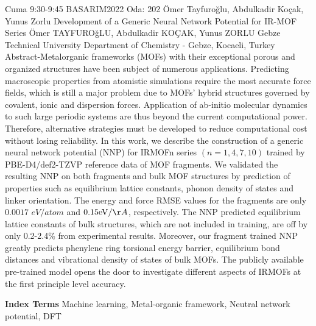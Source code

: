 
    \begin{abstract_basarim}
    {Cuma 9:30-9:45}
    {BASARIM2022}
    {Oda: 202}
    {Ömer Tayfuroğlu, Abdulkadir Koçak, Yunus Zorlu}
    {Development of a Generic Neural Network Potential for IR-MOF Series}
    {%
    Ömer TAYFUROğLU, Abdulkadir KOÇAK, Yunus ZORLU}
    {%
    }
    {%
    Gebze Technical University Department of Chemistry - Gebze, Kocaeli, Turkey}
    Abstract-Metalorganic frameworks (MOFs) with their exceptional porous and organized structures have been subject of numerous applications. Predicting macroscopic properties from atomistic simulations require the most accurate force fields, which is still a major problem due to MOFs' hybrid structures governed by covalent, ionic and dispersion forces. Application of ab-initio molecular dynamics to such large periodic systems are thus beyond the current computational power. Therefore, alternative strategies must be developed to reduce computational cost without losing reliability. In this work, we describe the construction of a generic neural network potential (NNP) for IRMOFn series $(n=1,4,7,10)$ trained by PBE-D4/def2-TZVP reference data of MOF fragments. We validated the resulting NNP on both fragments and bulk MOF structures by prediction of properties such as equilibrium lattice constants, phonon density of states and linker orientation. The energy and force RMSE values for the fragments are only $0.0017$ $e V / a t o m$ and $0.15 \mathrm{eV} / \AA$, respectively. The NNP predicted equilibrium lattice constants of bulk structures, which are not included in training, are off by only 0.2-2.4\% from experimental results. Moreover, our fragment trained NNP greatly predicts phenylene ring torsional energy barrier, equilibrium bond distances and vibrational density of states of bulk MOFs. The publicly available pre-trained model opens the door to investigate different aspects of IRMOFs at the first principle level accuracy. 
    
            \textbf{Index Terms} \newline{}Machine learning, Metal-organic framework, Neutral network potential, DFT
    \end{abstract_basarim}
    